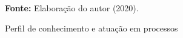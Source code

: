 \begin{figure}[ht!]
\centering

\caption{\textmd{Perfil de conhecimento e atuação em processos}}
\label{fig:grauconhecimento}

\par\medskip\textbf{Fonte:} Elaboração do autor (2020). \par\medskip

\end{figure}

